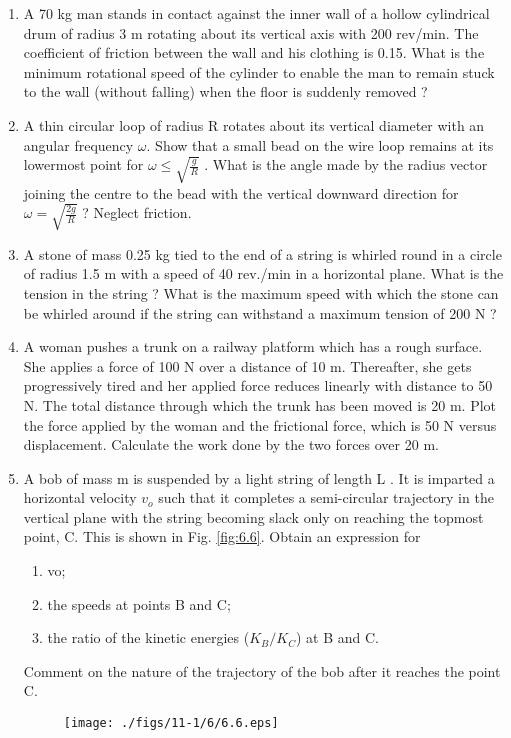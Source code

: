 \begin{enumerate}[label=\thesection.\arabic*.,ref=\thesection.\theenumi]
\item A 70 kg man stands in contact against the inner wall of a hollow cylindrical drum of radius 3 m rotating about its vertical axis with 200 rev/min. The coefficient of friction between the wall and his clothing is 0.15. What is the minimum rotational speed of the cylinder to enable the man to remain stuck to the wall (without falling) when the floor is suddenly removed ?
\item A thin circular loop of radius R rotates about its vertical diameter with an angular frequency $\omega$. Show that a small bead on the wire loop remains at its lowermost point for $\omega \le \sqrt{\frac{g}{R}}$ . What is the angle made by the radius vector joining the centre to the bead with the vertical downward direction for $\omega = \sqrt{\frac{2g}{R}}$  ? Neglect friction.
\item A stone of mass 0.25 kg tied to the end of a string is whirled round in a circle of radius 1.5 m with a speed of 40 rev./min in a horizontal plane. What is the tension in the string ? What is the maximum speed with which the stone can be whirled around if the string can withstand a maximum tension of 200 N ?
\item A woman pushes a trunk on a railway platform which has a rough surface. She applies a force of 100 N over a distance of 10 m. Thereafter, she gets progressively tired and her applied force reduces linearly with distance to 50 N. The total distance through which the trunk has been moved is 20 m. Plot the force applied by the woman and the frictional force, which is 50 N versus displacement. Calculate the work done by the two forces over 20 m.
\item A bob of mass m is suspended by a light string of length L . It is imparted a horizontal velocity $v_o$
such that it completes a semi-circular trajectory in the vertical plane with the string becoming slack only on reaching the topmost point, C. This is shown in Fig. \ref{fig:6.6}. Obtain an expression for 
\begin{enumerate}
\item  vo; 
\item  the speeds at points B and C; 
\item  the ratio of the kinetic energies ($K_B/K_C$) at B and C. 
\end{enumerate}
Comment on the nature
of the trajectory of the bob after it reaches the point C.
\begin{figure}[!ht]
\texttt{[image: ./figs/11-1/6/6.6.eps]}

\end{figure}
\end{enumerate}
